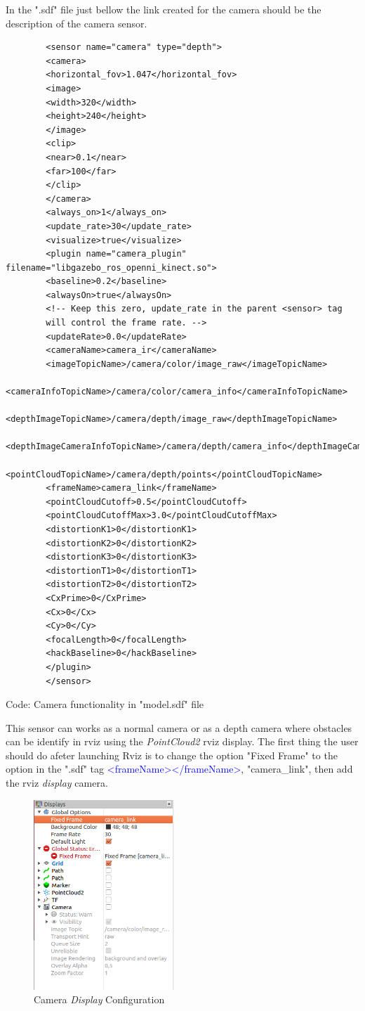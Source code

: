 	In the ".sdf" file just bellow the link created for the camera should be the description of the camera sensor.
		\begin{verbatim}
		<sensor name="camera" type="depth">
		<camera>
		<horizontal_fov>1.047</horizontal_fov>
		<image>
		<width>320</width>
		<height>240</height>
		</image>
		<clip>
		<near>0.1</near>
		<far>100</far>
		</clip>
		</camera>
		<always_on>1</always_on>
		<update_rate>30</update_rate>
		<visualize>true</visualize>
		<plugin name="camera_plugin" filename="libgazebo_ros_openni_kinect.so">
		<baseline>0.2</baseline>
		<alwaysOn>true</alwaysOn>
		<!-- Keep this zero, update_rate in the parent <sensor> tag
		will control the frame rate. -->
		<updateRate>0.0</updateRate>
		<cameraName>camera_ir</cameraName>
		<imageTopicName>/camera/color/image_raw</imageTopicName>
		<cameraInfoTopicName>/camera/color/camera_info</cameraInfoTopicName>
		<depthImageTopicName>/camera/depth/image_raw</depthImageTopicName>
		<depthImageCameraInfoTopicName>/camera/depth/camera_info</depthImageCameraInfoTopicName>
		<pointCloudTopicName>/camera/depth/points</pointCloudTopicName>
		<frameName>camera_link</frameName>
		<pointCloudCutoff>0.5</pointCloudCutoff>
		<pointCloudCutoffMax>3.0</pointCloudCutoffMax>
		<distortionK1>0</distortionK1>
		<distortionK2>0</distortionK2>
		<distortionK3>0</distortionK3>
		<distortionT1>0</distortionT1>
		<distortionT2>0</distortionT2>
		<CxPrime>0</CxPrime>
		<Cx>0</Cx>
		<Cy>0</Cy>
		<focalLength>0</focalLength>
		<hackBaseline>0</hackBaseline>
		</plugin>
		</sensor>
		\end{verbatim}
		\centerline{Code: Camera functionality in "model.sdf" file}
		
		This sensor can works as a normal camera or as a depth camera where obstacles can be identify in rviz using the \textit{PointCloud2} rviz display.
		The first thing the user should do afeter launching Rviz is to change the option "Fixed Frame" to the option in the ".sdf" tag \textcolor{blue}{<frameName></frameName>}, "camera\_link", then add the rviz \textit{display} camera.
		
		\begin{figure}[!ht]
			\centering
			\includegraphics[width=150pt]{figuras/camrviz.png}
			\caption{Camera \textit{Display} Configuration }
			\label{camrviz}
		\end{figure}
		
